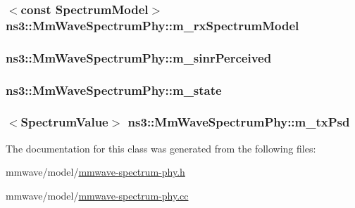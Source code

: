 \subsubsection[{\texorpdfstring{m\+\_\+rx\+Spectrum\+Model}{m_rxSpectrumModel}}]{$<$const {\bf Spectrum\+Model}$>$ ns3\+::\+Mm\+Wave\+Spectrum\+Phy\+::m\+\_\+rx\+Spectrum\+Model\hspace{0.3cm}{\ttfamily [private]}}\hypertarget{classns3_1_1MmWaveSpectrumPhy_a3de2c464f107275e80a013deaa7d5ee5}{}\label{classns3_1_1MmWaveSpectrumPhy_a3de2c464f107275e80a013deaa7d5ee5}
\subsubsection[{\texorpdfstring{m\+\_\+sinr\+Perceived}{m_sinrPerceived}}]{ ns3\+::\+Mm\+Wave\+Spectrum\+Phy\+::m\+\_\+sinr\+Perceived\hspace{0.3cm}{\ttfamily [private]}}\hypertarget{classns3_1_1MmWaveSpectrumPhy_a61da15a483343ea141a555b3712db8d7}{}\label{classns3_1_1MmWaveSpectrumPhy_a61da15a483343ea141a555b3712db8d7}
\subsubsection[{\texorpdfstring{m\+\_\+state}{m_state}}]{ ns3\+::\+Mm\+Wave\+Spectrum\+Phy\+::m\+\_\+state\hspace{0.3cm}{\ttfamily [private]}}\hypertarget{classns3_1_1MmWaveSpectrumPhy_ab6330aa9de7700e7e15b82000335665d}{}\label{classns3_1_1MmWaveSpectrumPhy_ab6330aa9de7700e7e15b82000335665d}
\subsubsection[{\texorpdfstring{m\+\_\+tx\+Psd}{m_txPsd}}]{$<${\bf Spectrum\+Value}$>$ ns3\+::\+Mm\+Wave\+Spectrum\+Phy\+::m\+\_\+tx\+Psd\hspace{0.3cm}{\ttfamily [private]}}\hypertarget{classns3_1_1MmWaveSpectrumPhy_a74933903ca8be36fdb800f3232a0d10d}{}\label{classns3_1_1MmWaveSpectrumPhy_a74933903ca8be36fdb800f3232a0d10d}


The documentation for this class was generated from the following files\+:\begin{DoxyCompactItemize}
\item 
mmwave/model/\hyperlink{mmwave-spectrum-phy_8h}{mmwave-\/spectrum-\/phy.\+h}\item 
mmwave/model/\hyperlink{mmwave-spectrum-phy_8cc}{mmwave-\/spectrum-\/phy.\+cc}\end{DoxyCompactItemize}
